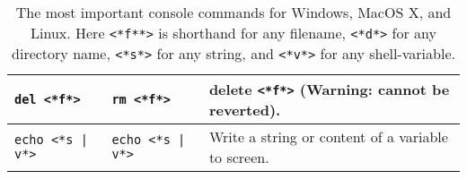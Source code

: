 \documentclass[fsharpNotes.tex]{subfiles}
\begin{document}
\begin{table}
\begin{tabularx}{\linewidth}{|l|l|>{\raggedright\arraybackslash}X|}
    {\lstinline[language=syntax]!del <*f*>!}
            & {\lstinline[language=syntax]!rm <*f*>!}
                          & delete {\lstinline[language=syntax]!<*f*>!} (Warning: cannot be reverted). \\ \hline
    {\lstinline[language=syntax, keywords={}]!echo <*s | v*>!\hspace*{5mm}}
            & {\lstinline[language=syntax, keywords={}]!echo <*s | v*>!\hspace*{5mm}}
                          & Write a string or content of a variable to screen. \\ \hline
  \end{tabularx}\\
  \caption{The most important console commands for Windows, MacOS X,
    and Linux. Here \lstinline[language=syntax]{<*f**>} is shorthand for any filename,
  \lstinline[language=syntax]{<*d*>} for any directory name,
\lstinline[language=syntax]{<*s*>} for any string, and
\lstinline[language=syntax]{<*v*>} for any shell-variable.}
  \label{tab:Kommandoer}
\end{table}
\end{document}
